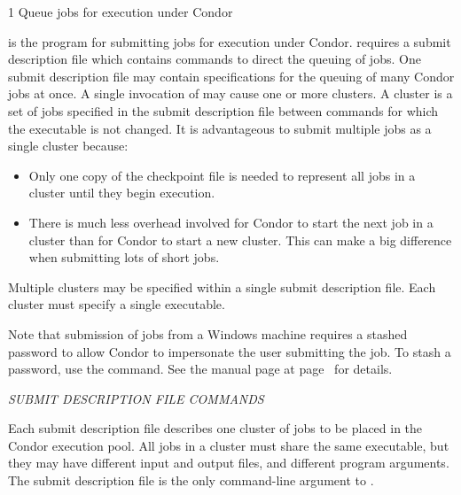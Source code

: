 \begin{ManPage}{\label{man-condor-submit}}{1}
{Queue jobs for execution under Condor}
\Synopsis {}
\oOpt{---}
\ToolDebugOption
\Lbr{}  \Opt{\Dots}\Rbr 
{}


\Description

 is the program for submitting jobs for execution
under Condor.
 requires a submit description file which contains commands
to direct the queuing of jobs.
One submit description file may contain
specifications for the queuing of many Condor jobs at once.
A single invocation of  may cause one or
more clusters.
A cluster is a set of jobs
specified in the submit description file
between  commands for which the executable is not changed.
It is advantageous to submit
multiple jobs as a single cluster because:
\begin{itemize}
\item Only one copy of the checkpoint file is needed to 
represent all jobs in a cluster until they begin execution.
\item There is much less overhead involved for Condor to start the next
job in a cluster than for Condor to start a new cluster.  This can make
a big difference when submitting lots of short jobs.
\end{itemize}

Multiple clusters may be specified within a single
submit description file.
Each cluster must specify a single executable.

Note that submission of jobs from a Windows machine requires
a stashed password to allow Condor to impersonate the user submitting
the job.
To stash a password, use the  command.
See the manual page at
page~\pageref{man-condor-store-cred} for details.

\emph{SUBMIT DESCRIPTION FILE COMMANDS}

Each submit description file describes one cluster of jobs to be
placed in the Condor execution pool. All jobs in a cluster must share
the same executable, but they may have different input and output files,
and different program arguments. The submit description file is
the only command-line argument to . 


\end{ManPage}
